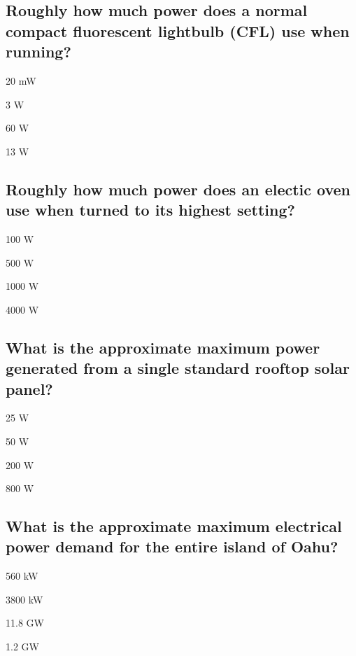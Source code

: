 \documentclass[11pt]{article}
\begin{document}
\subsection{Roughly how much power does a normal compact fluorescent lightbulb (CFL) use when running?}

\begin{answer}
	\item 20 mW
	\item 3 W
	\item 60 W
	\item 13 W
\end{answer}

\subsection{Roughly how much power does an electic oven use when turned to its highest setting?}

\begin{answer}
	\item 100 W
	\item 500 W
	\item 1000 W
	\item 4000 W
\end{answer}

\subsection{What is the approximate maximum power generated from a single standard rooftop solar panel?}

\begin{answer}
	\item 25 W
	\item 50 W
	\item 200 W
	\item 800 W
\end{answer}

\subsection{What is the approximate maximum electrical power demand for the entire island of Oahu?}

\begin{answer}
	\item 560 kW
	\item 3800 kW
	\item 11.8 GW
	\item 1.2 GW
\end{answer}
\end{document}
